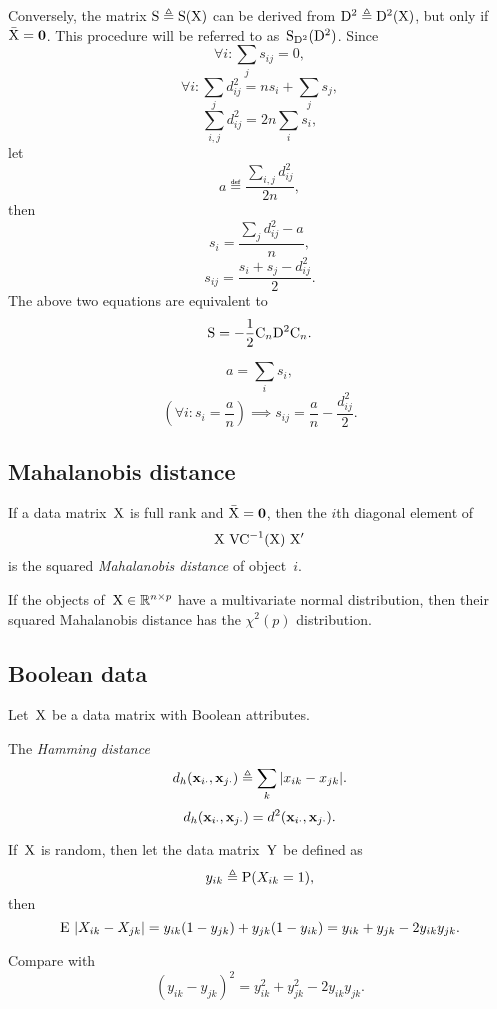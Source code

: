 \documentclass[10pt,a4paper]{article}
\theoremstyle{plain} \newtheorem{Lem}{Lemma}
\begin{document}
Conversely, the matrix $\mathrm S \triangleq \mathrm S (\mathrm X)$ can be derived from $\mathrm D^2 \triangleq \mathrm D^2(\mathrm X)$,
but only if $\bar {\mathrm X} = \mathbf 0$.
This procedure will be referred to as~$\mathrm S_{\mathrm D^2}(\mathrm D^2)$.
Since
$$ \forall i : \sum_j s_{ij} = 0, $$
$$ \forall i : \sum_j d^2_{ij} = n s_i + \sum_j s_j, $$
$$ \sum_{i,j} d^2_{ij} = 2 n \sum_i s_i, $$
let
$$ a \eqdef \frac {\sum_{i,j} d^2_{ij}} {2n}, $$
then
$$ s_i = \frac {\sum_j d^2_{ij} - a} n, $$
$$ s_{ij} = \frac {s_i + s_j - d^2_{ij}} 2. $$
The above two equations are equivalent to
$$ \mathrm S = - \frac 1 2 \mathrm C_n \mathrm D^2 \mathrm C_n. $$

$$ a = \sum_i s_i, $$
$$ \left(\forall i : s_i = \frac a n \right) \implies s_{ij} = \frac a n - \frac {d^2_{ij}} 2. $$


\subsection{Mahalanobis distance}
If a data matrix~$\mathrm X$ is full rank and $\bar {\mathrm X} = \mathbf 0$,
then the $i$th diagonal element of
\begin{equation} \label{mahalanobis}
\mathrm X \ \mathrm {VC}^{-1}(\mathrm X) \ \mathrm X'
\end{equation}
is the squared {\em Mahalanobis distance} of object~$i$.

If the objects of~$\mathrm X \in \mathbb R^{n \times p}$ have a multivariate normal distribution, then their squared Mahalanobis distance has the $\chi^2(p)$ distribution.


\subsection{Boolean data}
Let~$\mathrm X$ be a data matrix with Boolean attributes.

The {\em Hamming distance}
$$ d_h(\mathbf x_{i\cdot}, \mathbf x_{j\cdot}) \triangleq \sum_k |x_{ik} - x_{jk}|. $$
$$ d_h(\mathbf x_{i\cdot}, \mathbf x_{j\cdot}) = d^2 (\mathbf x_{i\cdot}, \mathbf x_{j\cdot}). $$

If~$\mathrm X$ is random, then let the data matrix~$\mathrm Y$ be defined as
$$ y_{ik} \triangleq \mathrm P (X_{ik} = 1), $$
then
$$ \mathrm E \  |X_{ik} - X_{jk}|
    =   y_{ik} (1 - y_{jk})
      + y_{jk} (1 - y_{ik})
    =   y_{ik}  + y_{jk} - 2 y_{ik} y_{jk}.
$$

Compare with
$$ (y_{ik} - y_{jk})^2 = y^2_{ik} + y^2_{jk} - 2 y_{ik} y_{jk}. $$
\end{document}
